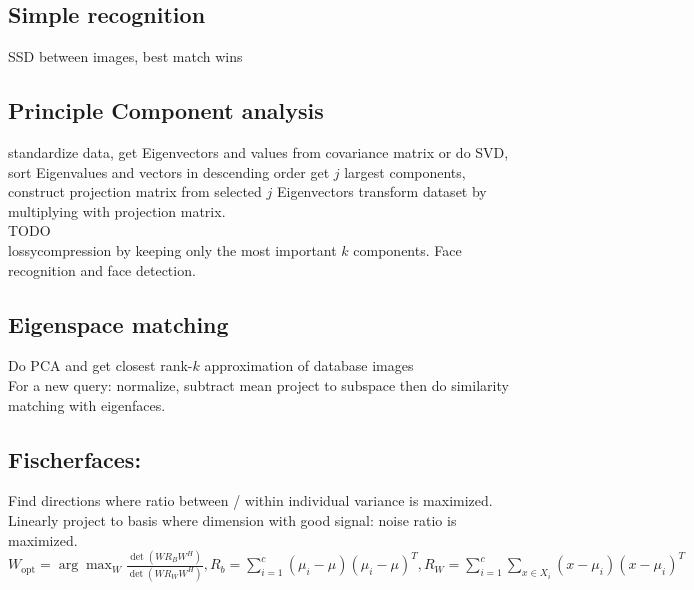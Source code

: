 \subsection*{Simple recognition}
SSD between images, best match wins 
\subsection*{Principle Component analysis }
 standardize data, get Eigenvectors and values from covariance matrix or do SVD, sort Eigenvalues and vectors in descending order get $j$ largest components, construct projection matrix from selected $j$ Eigenvectors transform dataset by multiplying with projection matrix.\\
TODO\\
 lossycompression by keeping only the most important $k$ components. Face recognition  and face detection.
\subsection*{Eigenspace matching}
Do PCA  and get closest rank-$k$ approximation of database images  \\
For a new query: normalize, subtract mean  project to subspace then do similarity matching with eigenfaces.
\subsection{Fischerfaces:} 
Find directions where ratio between / within individual variance is maximized. Linearly project to basis where dimension with good signal: noise ratio is maximized. \\
$W_{\text{opt}} = \arg\max_W \frac{\det(W R_B W^H)}{\det(W R_W W^H)}, R_b = \sum_{i = 1}^{c} (\mu_i - \mu)(\mu_i - \mu)^T, R_W = \sum_{i = 1}^{c} \sum_{x \in X_i} (x - \mu_i)(x - \mu_i)^T$\\
